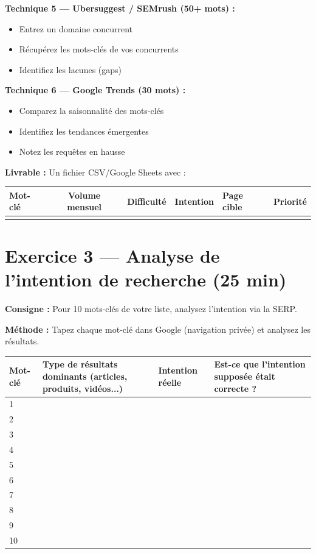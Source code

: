 \documentclass[12pt,a4paper]{report}
\begin{document}
\textbf{Technique 5 --- Ubersuggest / SEMrush (50+ mots) :}
\begin{itemize}
\item Entrez un domaine concurrent
\item Récupérez les mots-clés de vos concurrents
\item Identifiez les lacunes (gaps)
\end{itemize}

\textbf{Technique 6 --- Google Trends (30 mots) :}
\begin{itemize}
\item Comparez la saisonnalité des mots-clés
\item Identifiez les tendances émergentes
\item Notez les requêtes en hausse
\end{itemize}

\textbf{Livrable :} Un fichier CSV/Google Sheets avec :

\begin{tabular}{|l|c|c|c|l|c|}
\hline
\textbf{Mot-clé} & \textbf{Volume mensuel} & \textbf{Difficulté} & \textbf{Intention} & \textbf{Page cible} & \textbf{Priorité} \\
\hline
 & & & & & \\
\hline
\end{tabular}

\section{Exercice 3 --- Analyse de l'intention de recherche (25 min)}

\textbf{Consigne :} Pour 10 mots-clés de votre liste, analysez l'intention via la SERP.

\textbf{Méthode :} Tapez chaque mot-clé dans Google (navigation privée) et analysez les résultats.

\begin{longtable}{|l|l|l|l|}
\hline
\textbf{Mot-clé} & \textbf{Type de résultats dominants (articles, produits, vidéos...)} & \textbf{Intention réelle} & \textbf{Est-ce que l'intention supposée était correcte ?} \\
\hline
1 & & & \\
\hline
2 & & & \\
\hline
3 & & & \\
\hline
4 & & & \\
\hline
5 & & & \\
\hline
6 & & & \\
\hline
7 & & & \\
\hline
8 & & & \\
\hline
9 & & & \\
\hline
10 & & & \\
\hline
\end{longtable}
\end{document}
